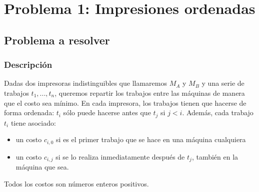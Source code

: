 \documentclass[a4paper]{report}
\begin{document}
\newcommand{\senial}{\textit{señal}}



\maketitle

\chapter{Problema 1: Impresiones ordenadas}

\section{Problema a resolver}

\subsection{Descripción}

Dadas dos impresoras indistinguibles que llamaremos $M_{A}$ y $M_{B}$ y una serie de trabajos $t_{1},...,t_{n}$, queremos repartir los trabajos entre las máquinas de manera que el costo sea mínimo. En cada impresora, los trabajos tienen que hacerse de forma ordenada: $t_{i}$ sólo puede hacerse antes que $t_{j}$ si $j<i$. Además, cada trabajo $t_{i}$ tiene asociado:

\begin{itemize}
    \item un costo $c_{i,0}$ si es el primer trabajo que se hace en una máquina cualquiera
    \item un costo $c_{i,j}$ si se lo realiza inmediatamente después de $t_{j}$, también en la máquina que sea.
\end{itemize}

Todos los costos son números enteros positivos.
\end{document}
